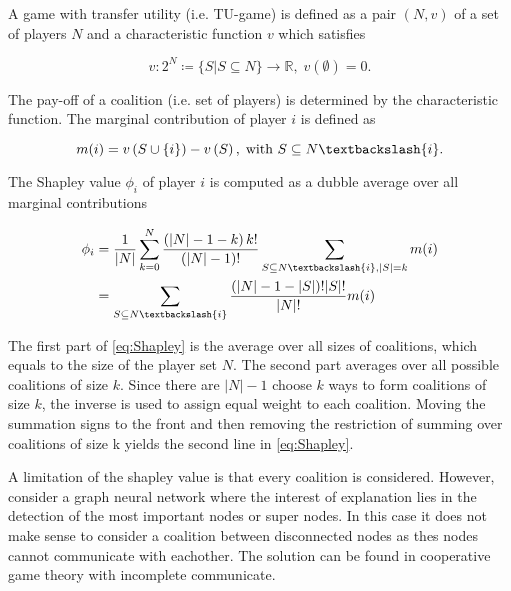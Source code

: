 \documentclass[twoside,twocolumn,9pt]{article}
\begin{document}
A game with transfer utility (i.e. TU-game) is defined as a pair $\left(N, v\right)$ of a set
of players $N$ and a characteristic function $v$ which satisfies\cite{}

\begin{equation}
	v: 2^N \coloneqq \{S | S \subseteq N\} \rightarrow \mathbb{R}, \; v\left(\emptyset\right) = 0.
\end{equation}

The pay-off of a coalition (i.e. set of players) is determined by the characteristic
function. The marginal contribution of player $i$ is defined as\cite{}

\begin{equation}
	m(i) = v\left(S \cup \{i\}\right) - v\left(S\right), \; \text{with } S \subseteq N \textbackslash \{i\}.
\end{equation}

The Shapley value $\phi_i$ of player $i$ is computed as a dubble average over all marginal contributions\cite{}

\begin{equation}
	\label{eq:Shapley}
	\begin{split}
		\phi_i & = \frac{1}{|N|} \sum_{k=0}^N \frac{\left(|N| - 1 - k\right)k!}{\left(|N| - 1\right)!} \sum_{S \subseteq N \textbackslash \{i\}, |S| = k} m(i) \\
		& = \sum_{S \subseteq N \textbackslash \{i\}} \frac{\left(|N| - 1 - |S| \right)!|S|!}{|N|!} m(i)
	\end{split}
\end{equation}

The first part of \cref{eq:Shapley} is the average over all sizes of coalitions, which
equals to the size of the player set $N$. The second part averages over all possible coalitions
of size $k$. Since there are $|N| - 1$ choose $k$ ways to form coalitions of size $k$, the inverse
is used to assign equal weight to each coalition. Moving the summation signs to the front and
then removing the restriction of summing over coalitions of size k yields the second line in
\cref{eq:Shapley}.

A limitation of the shapley value is that every coalition is considered. However, consider
a graph neural network where the interest of explanation lies in the detection of the most
important nodes or super nodes. In this case it does not make sense to consider a coalition
between disconnected nodes as thes nodes cannot communicate with eachother.\cite{} The
solution can be found in cooperative game theory with incomplete communicate.
\end{document}
